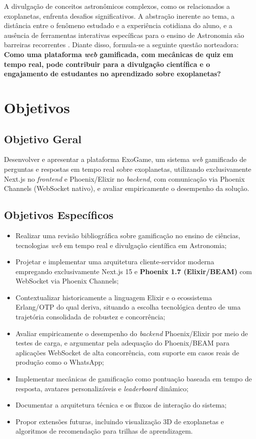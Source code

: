 \documentclass[
	12pt,
	openany,
	oneside,
	a4paper,
	english,
	brazil
]{abntex2}
\begin{document}
A divulgação de conceitos astronômicos complexos, como os relacionados a exoplanetas, enfrenta desafios significativos. A abstração inerente ao tema, a distância entre o fenômeno estudado e a experiência cotidiana do aluno, e a ausência de ferramentas interativas específicas para o ensino de Astronomia são barreiras recorrentes \cite{langhi2009, bretones2006}. Diante disso, formula-se a seguinte questão norteadora: \textbf{Como uma plataforma \textit{web} gamificada, com mecânicas de quiz em tempo real, pode contribuir para a divulgação científica e o engajamento de estudantes no aprendizado sobre exoplanetas?}

\section{Objetivos}

\subsection{Objetivo Geral}

Desenvolver e apresentar a plataforma ExoGame, um sistema \textit{web} gamificado de perguntas e respostas em tempo real sobre exoplanetas, utilizando exclusivamente Next.js no \textit{frontend} e Phoenix/Elixir no \textit{backend}, com comunicação via Phoenix Channels (WebSocket nativo), e avaliar empiricamente o desempenho da solução.

\subsection{Objetivos Específicos}

\begin{itemize}
  \item Realizar uma revisão bibliográfica sobre gamificação no ensino de ciências, tecnologias \textit{web} em tempo real e divulgação científica em Astronomia;
  \item Projetar e implementar uma arquitetura cliente-servidor moderna empregando exclusivamente Next.js 15 e \textbf{Phoenix 1.7 (Elixir/BEAM)} com WebSocket via Phoenix Channels;
  \item Contextualizar historicamente a linguagem Elixir e o ecossistema Erlang/OTP do qual deriva, situando a escolha tecnológica dentro de uma trajetória consolidada de robustez e concorrência;
  \item Avaliar empiricamente o desempenho do \textit{backend} Phoenix/Elixir por meio de testes de carga, e argumentar pela adequação do Phoenix/BEAM para aplicações WebSocket de alta concorrência, com suporte em casos reais de produção como o WhatsApp;
  \item Implementar mecânicas de gamificação como pontuação baseada em tempo de resposta, avatares personalizáveis e \textit{leaderboard} dinâmico;
  \item Documentar a arquitetura técnica e os fluxos de interação do sistema;
  \item Propor extensões futuras, incluindo visualização 3D de exoplanetas e algoritmos de recomendação para trilhas de aprendizagem.
\end{itemize}
\end{document}
